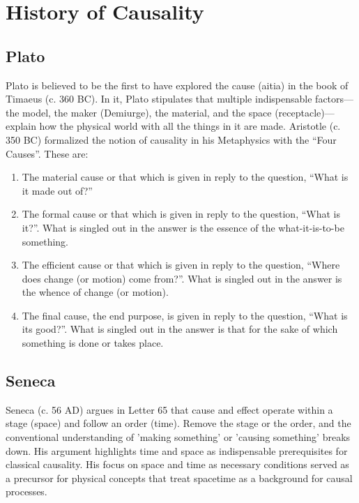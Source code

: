 \section{History of Causality}
\label{sec:history}

\subsection{Plato}
\label{sec:history_plato}

Plato is believed to be the first to have explored the cause (aitia) in the book of Timaeus (c. 360 BC). In it, Plato stipulates that multiple indispensable factors—the model, the maker (Demiurge), the material, and the space (receptacle)—explain how the physical world with all the things in it are made\cite{PlatoTimaeusSEP}. Aristotle (c. 350 BC) formalized the notion of causality in his Metaphysics\cite{AristotleMetaphysicsSEP} with the ``Four Causes''\cite{AristotleCausalitySEP}. These are:

\begin{enumerate}
    \item The material cause or that which is given in reply to the question, ``What is it made out of?''
    \item The formal cause or that which is given in reply to the question, ``What is it?''. What is singled out in the answer is the essence of the what-it-is-to-be something.
    \item The efficient cause or that which is given in reply to the question, ``Where does change (or motion) come from?''. What is singled out in the answer is the whence of change (or motion).
    \item The final cause, the end purpose, is given in reply to the question, ``What is its good?''. What is singled out in the answer is that for the sake of which something is done or takes place.
\end{enumerate}

\subsection{Seneca}
\label{sec:history_seneca}

Seneca (c. 56 AD) argues in Letter 65\cite{SenecaLetters} that cause and effect operate within a stage (space) and follow an order (time). Remove the stage or the order, and the conventional understanding of 'making something' or 'causing something' breaks down. His argument highlights time and space as indispensable prerequisites for classical causality. His focus on space and time as necessary conditions served as a precursor for physical concepts that treat spacetime as a background for causal processes.

